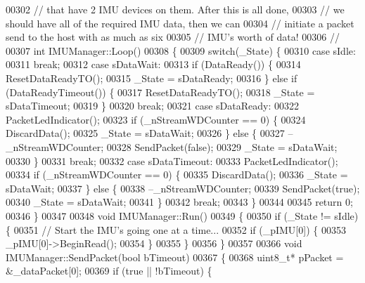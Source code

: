 \begin{DoxyCode}
{00302 \textcolor{comment}{//  that have 2 IMU devices on them. After this is all done,}
00303 \textcolor{comment}{//  we should have all of the required IMU data, then we can}
00304 \textcolor{comment}{//  initiate a packet send to the host with as much as six }
00305 \textcolor{comment}{//  IMU's worth of data!}
00306 \textcolor{comment}{//}
00307 \textcolor{keywordtype}{int} IMUManager::Loop()
00308 \{
00309     \textcolor{keywordflow}{switch}(\_State) \{
00310     \textcolor{keywordflow}{case} sIdle:
00311         \textcolor{keywordflow}{break};
00312     \textcolor{keywordflow}{case} sDataWait:
00313         \textcolor{keywordflow}{if} (DataReady()) \{
00314             ResetDataReadyTO();
00315             \_State = sDataReady;
00316         \} \textcolor{keywordflow}{else} \textcolor{keywordflow}{if} (DataReadyTimeout()) \{
00317             ResetDataReadyTO();
00318             \_State = sDataTimeout;
00319         \}
00320         \textcolor{keywordflow}{break};
00321     \textcolor{keywordflow}{case} sDataReady:
00322         PacketLedIndicator();
00323         \textcolor{keywordflow}{if} (\_nStreamWDCounter == 0) \{
00324             DiscardData();
00325             \_State = sDataWait;
00326         \} \textcolor{keywordflow}{else} \{
00327             --\_nStreamWDCounter;
00328             SendPacket(\textcolor{keyword}{false});
00329             \_State = sDataWait;
00330         \}
00331         \textcolor{keywordflow}{break};
00332     \textcolor{keywordflow}{case} sDataTimeout:
00333         PacketLedIndicator();
00334         \textcolor{keywordflow}{if} (\_nStreamWDCounter == 0) \{
00335             DiscardData();
00336             \_State = sDataWait;
00337         \} \textcolor{keywordflow}{else} \{
00338             --\_nStreamWDCounter;
00339             SendPacket(\textcolor{keyword}{true});
00340             \_State = sDataWait;
00341         \}
00342         \textcolor{keywordflow}{break};
00343     \}
00344     
00345     \textcolor{keywordflow}{return} 0;
00346 \}
00347 
00348 \textcolor{keywordtype}{void} IMUManager::Run()
00349 \{
00350     \textcolor{keywordflow}{if} (\_State != sIdle) \{
00351         \textcolor{comment}{// Start the IMU's going one at a time...}
00352         \textcolor{keywordflow}{if} (\_pIMU[0]) \{
00353             \_pIMU[0]->BeginRead();
00354         \}
00355     \}
00356 \}
00357 
00366 \textcolor{keywordtype}{void} IMUManager::SendPacket(\textcolor{keywordtype}{bool} bTimeout)
00367 \{
00368     uint8\_t*    pPacket = &\_dataPacket[0];
00369     \textcolor{keywordflow}{if} (\textcolor{keyword}{true} || !bTimeout) \{
}
\end{DoxyCode}
